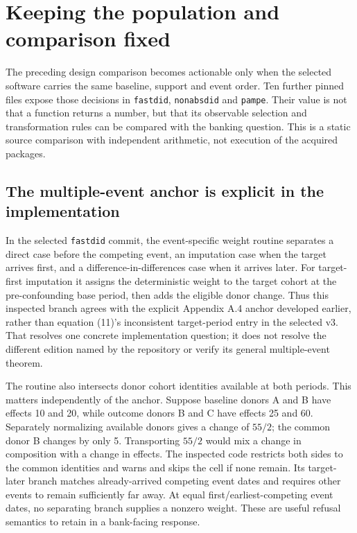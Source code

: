 \section{Keeping the population and comparison fixed}
\label{sec:exec28-panel-delegates}

The preceding design comparison becomes actionable only when the selected software carries the same baseline, support
and event order. Ten further pinned files expose those decisions in \texttt{fastdid}, \texttt{nonabsdid} and \texttt{pampe}.
Their value is not that a function returns a number, but that its observable selection and transformation rules can be
compared with the banking question. This is a static source comparison with independent arithmetic, not execution of the
acquired packages.~\citep{exec28_panel_delegates}

\subsection{The multiple-event anchor is explicit in the implementation}

In the selected \texttt{fastdid} commit, the event-specific weight routine separates a direct case before the competing
event, an imputation case when the target arrives first, and a difference-in-differences case when it arrives later.
For target-first imputation it assigns the deterministic weight to the target cohort at the pre-confounding base period,
then adds the eligible donor change. Thus this inspected branch agrees with the explicit Appendix A.4 anchor developed
earlier, rather than equation (11)'s inconsistent target-period entry in the selected v3. That resolves one concrete
implementation question; it does not resolve the different edition named by the repository or verify its general
multiple-event theorem.~\citep{exec28_panel_delegates}

The routine also intersects donor cohort identities available at both periods. This matters independently of the anchor.
Suppose baseline donors A and B have effects 10 and 20, while outcome donors B and C have effects 25 and 60. Separately
normalizing available donors gives a change of $55/2$; the common donor B changes by only 5. Transporting $55/2$ would
mix a change in composition with a change in effects. The inspected code restricts both sides to the common identities
and warns and skips the cell if none remain. Its target-later branch matches already-arrived competing event dates and
requires other events to remain sufficiently far away. At equal first/earliest-competing event dates, no separating branch
supplies a nonzero weight. These are useful refusal semantics to retain in a bank-facing response.~\citep{exec28_panel_delegates,exec28_panel_delegate_reference}

